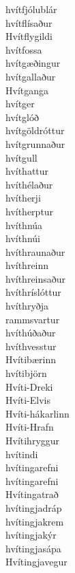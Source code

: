 \documentclass[../samsetningasafn.tex]{subfiles}
\begin{document}
\begin{bigwordlist}
\begin{footnotesize}
\begin{multicols}{4}
\begin{description}
		\item [hvítfjólublár]
		\item [hvítflísaður]
		\item [Hvítflygildi]
		\item [hvítfossa]
		\item [hvítgæðingur]
		\item [hvítgallaður]
		\item [Hvítganga]
		\item [hvítger]
		\item [hvítglóð]
		\item [hvítgöldróttur]
		\item [hvítgrunnaður]
		\item [hvítgull]
		\item [hvíthattur]
		\item [hvíthélaður]
		\item [hvítherji]
		\item [hvítherptur]
		\item [hvíthnúa]
		\item [hvíthnúi]
		\item [hvíthraunaður]
		\item [hvíthreinn]
		\item [hvíthreinsaður]
		\item [hvíthríslóttur]
		\item [hvíthryðja]
		\item [rammsvartur]
		\item [hvíthúðaður]
		\item [hvíthvesstur]
		\item [Hvítibærinn]
		\item [hvítibjörn]
		\item [Hvíti-Dreki]
		\item [Hvíti-Elvis]
		\item [Hvíti-hákarlinn]
		\item [Hvíti-Hrafn]
		\item [Hvítihryggur]
		\item [hvítindi]
		\item [hvítingarefni]
		\item [hvítingarefni]
		\item [Hvítingatrað]
		\item [hvítingjadráp]
		\item [hvítingjakrem]
		\item [hvítingjakýr]
		\item [hvítingjasápa]
		\item [Hvítingjavegur]

\end{description}
\end{multicols}
\end{footnotesize}
\end{bigwordlist}
\end{document}

